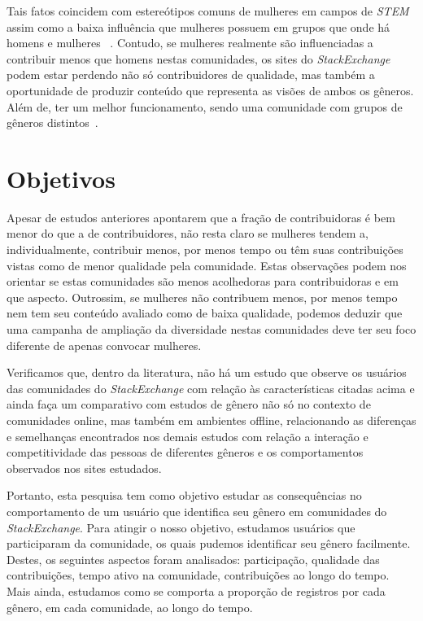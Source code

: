 Tais fatos coincidem com estereótipos comuns de mulheres em campos de \emph{STEM}~\cite{spencer1999stereotype} assim como a baixa influência que mulheres possuem em grupos que onde há homens e mulheres ~\cite{karpowitz2012gender}. Contudo, se mulheres realmente são influenciadas a contribuir menos que homens nestas comunidades, os sites do \emph{StackExchange} podem estar perdendo não só contribuidores de qualidade, mas também a oportunidade de produzir conteúdo que representa as visões de ambos os gêneros. Além de, ter um melhor funcionamento, sendo uma comunidade com grupos de gêneros distintos~\cite{marshall1975boys}.


\section{Objetivos}

Apesar de estudos anteriores apontarem que a fração de contribuidoras é bem menor do que a de contribuidores, não resta claro se mulheres tendem a, individualmente, contribuir menos, por menos tempo ou têm suas contribuições vistas como de menor qualidade pela comunidade. Estas observações podem nos orientar se estas comunidades são menos acolhedoras para contribuidoras e em que aspecto. Outrossim, se mulheres não contribuem menos, por menos tempo nem tem seu conteúdo avaliado como de baixa qualidade, podemos deduzir que uma campanha de ampliação da diversidade nestas comunidades deve ter seu foco diferente de apenas convocar mulheres.

Verificamos que, dentro da literatura, não há um estudo que observe os usuários das comunidades do \emph{StackExchange} com relação às características citadas acima e ainda faça um comparativo com estudos de gênero não só no contexto de comunidades online, mas também em ambientes offline, relacionando as diferenças e semelhanças encontrados nos demais estudos com relação a interação e competitividade das pessoas de diferentes gêneros e os comportamentos observados nos sites estudados.

Portanto, esta pesquisa tem como objetivo estudar as consequências no comportamento de um usuário que identifica seu gênero em comunidades do \emph{StackExchange}. Para atingir o nosso objetivo, estudamos usuários que participaram da comunidade, os quais pudemos identificar seu gênero facilmente. Destes, os seguintes aspectos foram analisados: participação, qualidade das contribuições, tempo ativo na comunidade, contribuições ao longo do tempo. Mais ainda, estudamos como se comporta a proporção de registros por cada gênero, em cada comunidade, ao longo do tempo.


